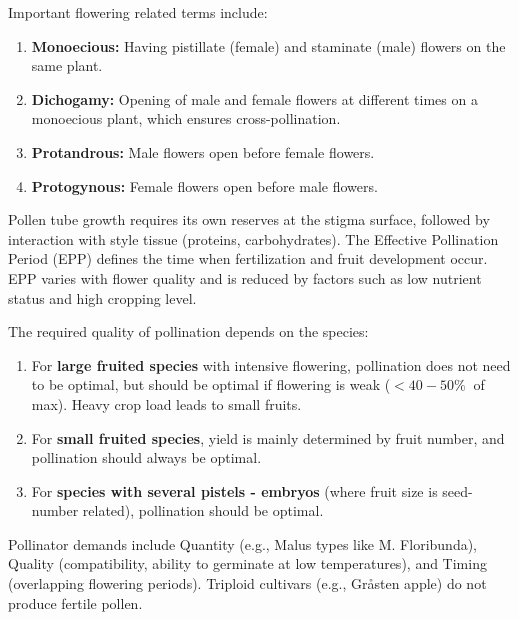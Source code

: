 \vspace{0.5em}
Important flowering related terms include: 

\begin{enumerate} 
    \item \textbf{Monoecious:} Having pistillate (female) and staminate (male) flowers on the same plant. 
    \item \textbf{Dichogamy:} Opening of male and female flowers at different times on a monoecious plant, which ensures cross-pollination. 
    \item \textbf{Protandrous:} Male flowers open before female flowers. 
    \item \textbf{Protogynous:} Female flowers open before male flowers. 
\end{enumerate} 

\vspace{0.5em}
Pollen tube growth requires its own reserves at the stigma surface, followed by interaction with style tissue (proteins, carbohydrates). The Effective Pollination Period (EPP) defines the time when fertilization and fruit development occur. EPP varies with flower quality and is reduced by factors such as low nutrient status and high cropping level.

\vspace{0.5em}
The required quality of pollination depends on the species: 

\begin{enumerate} 
    \item For \textbf{large fruited species} with intensive flowering, pollination does not need to be optimal, but should be optimal if flowering is weak ($<40-50\%\ $ of max). Heavy crop load leads to small fruits. 
    \item For \textbf{small fruited species}, yield is mainly determined by fruit number, and pollination should always be optimal. 
    \item For \textbf{species with several pistels - embryos} (where fruit size is seed-number related), pollination should be optimal. 
\end{enumerate} 

\vspace{0.5em}
Pollinator demands include Quantity (e.g., Malus types like M. Floribunda), Quality (compatibility, ability to germinate at low temperatures), and Timing (overlapping flowering periods). Triploid cultivars (e.g., Gråsten apple) do not produce fertile pollen.

